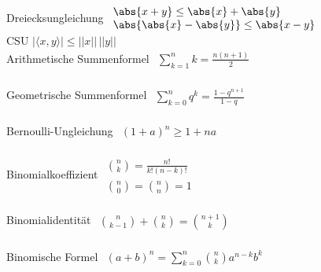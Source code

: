 Dreiecksungleichung \qquad \qquad
\begin{math}\begin{array}{l}
		\abs{x + y} \le \abs{x} + \abs{y} \\
		\abs{\abs{x}- \abs{y}} \le \abs{x-y}
	\end{array}\end{math} \\
CSU \qquad \qquad \qquad \qquad \qquad \quad
\begin{math}
	|\langle x,y \rangle| \le ||x|| \, ||y||
\end{math} \\
Arithmetische Summenformel
\begin{math}\begin{array}{l}
		\sum\limits_{k = 1}^{n}k = \frac{n (n+1)}{2}
	\end{array}\end{math}  \\
\\
Geometrische Summenformel 
\begin{math}\begin{array}{l}
		\sum\limits_{k = 0}^{n}q^k = \frac{1 - q^{n+1}}{1-q}
	\end{array}\end{math}\\
\\
Bernoulli-Ungleichung \qquad \quad
\begin{math}\begin{array}{l}
		(1+a)^n \ge 1 + na
	\end{array}\end{math}\\
\\
Binomialkoeffizient \qquad \qquad
\begin{math}\begin{array}{l}
		\binom{n}{k} = \frac{n!}{k!(n-k)!} \\
		\binom{n}{0} = \binom{n}{n} = 1
	\end{array}\end{math}\\
\\
Binomialidentität \qquad \qquad \quad
\begin{math}\begin{array}{l}
		\binom{n}{k-1}+\binom{n}{k} = \binom{n+1}{k}
	\end{array}\end{math}\\
\\
Binomische Formel \qquad \qquad
\begin{math}\begin{array}{l}
		(a+b)^n = \sum\limits_{k = 0}^{n} \binom{n}{k} a^{n-k} b^{k}
	\end{array}\end{math}

